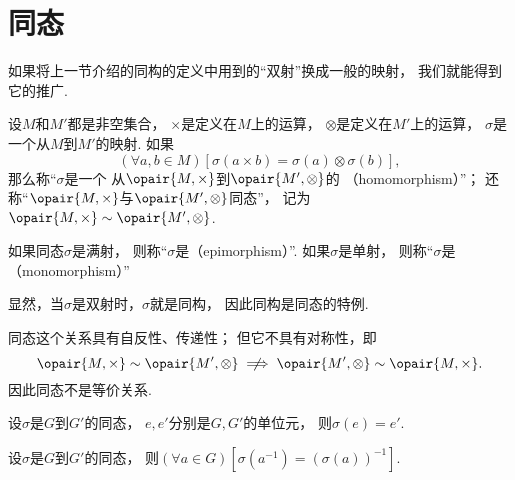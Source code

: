 \section{同态}
如果将上一节介绍的同构的定义中用到的“双射”换成一般的映射，
我们就能得到它的推广.

\begin{definition}
设\(M\)和\(M'\)都是非空集合，
\(\times\)是定义在\(M\)上的运算，
\(\otimes\)是定义在\(M'\)上的运算，
\(\sigma\)是一个从\(M\)到\(M'\)的映射.
如果\begin{equation*}
	(\forall a,b \in M)[
		\sigma(a \times b) = \sigma(a) \otimes \sigma(b)
	],
\end{equation*}
那么称“\(\sigma\)是一个%
从\(\opair{M,\times}\)到\(\opair{M',\otimes}\)的%
（homomorphism）”；
还称“\(\opair{M,\times}\)与\(\opair{M',\otimes}\)同态”，
记为\(\opair{M,\times} \Homomorphism \opair{M',\otimes}\).
\end{definition}

如果同态\(\sigma\)是满射，
则称“\(\sigma\)是（epimorphism）”.
如果\(\sigma\)是单射，
则称“\(\sigma\)是（monomorphism）”

显然，当\(\sigma\)是双射时，\(\sigma\)就是同构，
因此同构是同态的特例.

同态这个关系具有自反性、传递性；
但它不具有对称性，即\begin{equation*}
	\opair{M,\times}\Homomorphism\opair{M',\otimes}
	\notimplies
	\opair{M',\otimes}\Homomorphism\opair{M,\times}.
\end{equation*}
因此同态不是等价关系.

\begin{property}
设\(\sigma\)是\(G\)到\(G'\)的同态，
\(e,e'\)分别是\(G,G'\)的单位元，
则\(\sigma(e)=e'\).
\end{property}

\begin{property}
设\(\sigma\)是\(G\)到\(G'\)的同态，
则\((\forall a \in G)[\sigma(a^{-1})=(\sigma(a))^{-1}]\).
\end{property}

